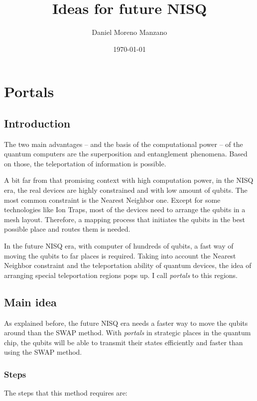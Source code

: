 \documentclass[11pt]{article}
\author{Daniel Moreno Manzano}
\date{\today}
\title{Ideas for future NISQ}
\begin{document}
\maketitle

\section{Portals}
\label{sec:org995b045}

\subsection{Introduction}
\label{sec:org3d38321}

The two main advantages -- and the basis of the computational power -- of the quantum computers are the superposition and entanglement phenomena.
Based on those, the teleportation of information is possible.

A bit far from that promising context with high computation power, in the NISQ era, the real devices are highly constrained and with low amount of qubits. 
The most common constraint is the Nearest Neighbor one.
Except for some technologies like Ion Traps, most of the devices need to arrange the qubits in a mesh layout.
Therefore, a mapping process that initiates the qubits in the best possible place and routes them is needed.

In the future NISQ era, with computer of hundreds of qubits, a fast way of moving the qubits to far places is required.
Taking into account the Nearest Neighbor constraint and the teleportation ability of quantum devices, the idea of arranging special teleportation regions pops up.
I call \emph{portals} to this regions.

\subsection{Main idea}
\label{sec:orga729753}

As explained before, the future NISQ era needs a faster way to move the qubits around than the SWAP method.
With \emph{portals} in strategic places in the quantum chip, the qubits will be able to transmit their states efficiently and faster than using the SWAP method.

\subsubsection{Steps}
\label{sec:org01ff635}

The steps that this method requires are:
\end{document}
